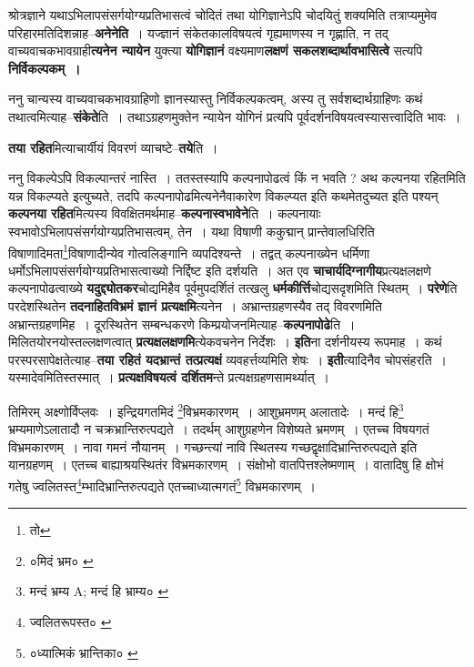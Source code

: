\documentclass[article,12pt,a4paper]{memoir}
\begin{document}
	  \pstart श्रोत्रज्ञाने यथाऽभिलापसंसर्गयोग्यप्रतिभासत्वं चोदितं तथा योगिज्ञानेऽपि चोदयितुं शक्यमिति तत्राप्यमुमेव परिहारमतिदिशन्नाह--\textbf{अनेनेति} । यज्ज्ञानं संकेतकालविषयत्वं गृह्यमाणस्य न गृह्णाति, न तद् वाच्यवाचकभावग्राही\textbf{त्यनेन न्यायेन} युक्त्या \textbf{योगिज्ञानं} वक्ष्यमाण\textbf{लक्षणं सकलशब्दार्थावभासित्वे} सत्यपि \textbf{निर्विकल्पकम् ।}
	\pend
      

	  \pstart ननु चान्यस्य वाच्यवाचकभावग्राहिणो ज्ञानस्यास्तु निर्विकल्पकत्वम्, अस्य तु सर्वशब्दार्थग्राहिणः कथं तथात्वमित्याह--\textbf{संकेते}ति । तथाऽग्रहणमुक्तेन न्यायेन योगिनं प्रत्यपि पूर्वदर्शनविषयत्वस्यासत्त्वादिति भावः ।
	\pend
      

	  \pstart \textbf{तया रहित}मित्याचार्यीयं विवरणं व्याच\leavevmode{}ष्टे--\textbf{तये}ति ।
	\pend
      

	  \pstart ननु विकल्पेऽपि विकल्पान्तरं नास्ति । ततस्तस्यापि कल्पनापोढत्वं किं न भवति ? अथ कल्पनया रहितमिति यन्न विकल्प्यते इत्युच्यते, तदपि कल्पनापोढमित्यनेनैवाकारेण विकल्प्यत इति कथमेतदुच्यत इति पश्यन् \textbf{कल्पनया रहित}मित्यस्य विवक्षितमर्थमाह--\textbf{कल्पनास्वभावेने}ति । कल्पनायाः स्वभावोऽभिलापसंसर्गयोग्यप्रतिभासत्वम्, तेन । यथा विषाणी ककुद्मान् प्रान्तेवालधिरिति विषाणादिमता\footnote{तो}\-विषाणादीन्येव गोत्वलिङ्गानि व्यपदिश्यन्ते । तद्वत् कल्पनाख्येन धर्मिणा धर्मोऽभिलापसंसर्गयोग्यप्रतिभासत्वाख्यो निर्द्दिष्ट इति दर्शयति । अत एव \textbf{चाचार्यदिग्नागीय}प्रत्यक्षलक्षणे कल्पनापोढत्वाख्ये \textbf{यदुद्द्योतकर}चोद्यमिहैव पूर्वमुपदर्शितं तत्खलु \textbf{धर्मकीर्त्ति}चोद्यसदृशमिति स्थितम् । \textbf{परेणे}ति परदेशस्थितेन \textbf{तदनाहितविभ्रमं ज्ञानं प्रत्यक्षमि}त्यनेन । अभ्रान्तग्रहणस्यैव तद् विवरणमिति अभ्रान्तग्रहणमिह । दूरस्थितेन सम्बन्धकरणे किम्प्रयोजनमित्याह--\textbf{कल्पनापोढे}ति । मिलितयोरनयोस्तल्लक्षणत्वात् \textbf{प्रत्यक्षलक्षणमि}त्येकवचनेन निर्देशः । \textbf{इति}ना दर्शनीयस्य रूपमाह । कथं परस्परसापेक्षतेत्याह--\textbf{तया रहितं यदभ्रान्तं तत्प्रत्यक्षं} व्यवहर्त्तव्यमिति शेषः । \textbf{इती}त्यादिनैव चोपसंहरति । यस्मादेवमितिस्तस्मात् । \textbf{प्रत्यक्षविषयत्वं दर्शितम}न्ते प्रत्यक्षग्रहणसामर्थ्यात् ।
	\pend
	  \bigskip
	  \begingroup
	

	  \pstart तिमिरम् अक्ष्णोर्विप्लवः । इन्द्रियगतमिदं \footnote{०मिदं भ्रम० \cite{dp-msB}}\-विभ्रमकारणम् । आशुभ्रमणम् अलातादेः । मन्दं हि\footnote{मन्दं भ्रम्य A; मन्दं हि भ्राम्य० \cite{dp-msC} \cite{dp-msD} \cite{dp-msB} \cite{dp-edN}} भ्रम्यमाणेऽलातादौ न चक्रभ्रान्तिरुत्पद्यते । तदर्थम् आशुग्रहणेन विशेष्यते भ्रमणम् । एतच्च विषयगतं विभ्रमकारणम् । नावा गमनं नौयानम् । गच्छन्त्यां नावि स्थितस्य गच्छद्वृक्षादिभ्रान्तिरुत्पद्यते इति यानग्रहणम् । एतच्च बाह्याश्रयस्थितंर विभ्रमकारणम् । संक्षोभो वातपित्तश्लेष्मणाम् । वातादिषु हि क्षोभं गतेषु ज्वलितस्त\footnote{ज्वलितरूपस्त० \cite{dp-msB} \cite{dp-msD}}म्भादिभ्रान्तिरुत्पद्यते एतच्चाध्यात्मगतं\footnote{०ध्यात्मिकं भ्रान्तिका० \cite{dp-msB} \cite{dp-msD}} विभ्रमकारणम् ।
	\pend
       
\end{document}
